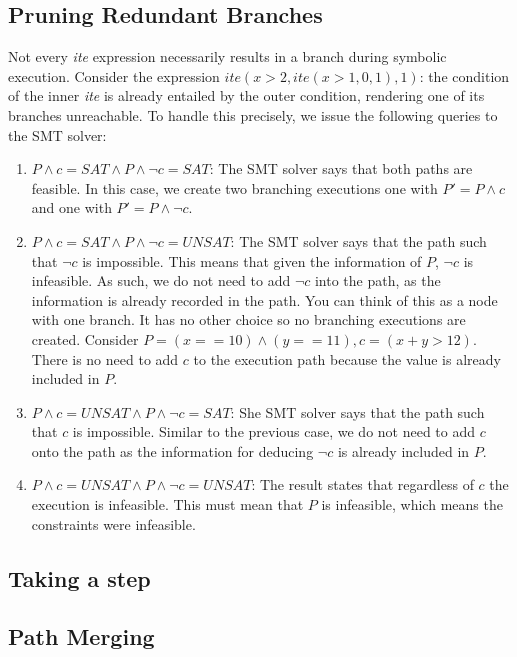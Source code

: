 \documentclass[11pt]{article}
\begin{document}
\subsection{Pruning Redundant Branches}

Not every \textit{ite} expression necessarily results in a branch during symbolic execution. Consider the expression $ite(x>2, ite(x>1, 0, 1), 1)$: the condition of the inner \textit{ite} is already entailed by the outer condition, rendering one of its branches unreachable. To handle this precisely, we issue the following queries to the SMT solver:
\begin{enumerate}
    \item{$P\land c = \textit{SAT} \land P\land \lnot c = \textit{SAT}$}: The SMT solver says that both paths are feasible. In this case, we create two branching executions one with $P'=P\land c$ and one with $P'=P\land \lnot c$. 
    \item {$P\land c = \textit{SAT} \land P\land \lnot c = \textit{UNSAT}$}: The SMT solver says that the path such that $\lnot c$ is impossible. This means that given the information of $P$, $\lnot c$ is infeasible. As such, we do not need to add $\lnot c$ into the path, as the information is already recorded in the path. You can think of this as a node with one branch. It has no other choice so no branching executions are created. Consider $P=(x==10)\land (y==11), c=(x+y>12)$. There is no need to add $c$ to the execution path because the value is already included in $P$. 
    \item {$P\land c = \textit{UNSAT} \land P\land \lnot c = \textit{SAT}$}: She SMT solver says that the path such that $c$ is impossible. Similar to the previous case, we do not need to add $c$ onto the path as the information for deducing $\lnot c$ is already included in $P$. 
    \item {$P\land c = \textit{UNSAT} \land P\land \lnot c = \textit{UNSAT}$}: The result states that regardless of $c$ the execution is infeasible. This must mean that $P$ is infeasible, which means the constraints were infeasible. 
\end{enumerate} 

\subsection{Taking a step}



\subsection{Path Merging}
\end{document}
